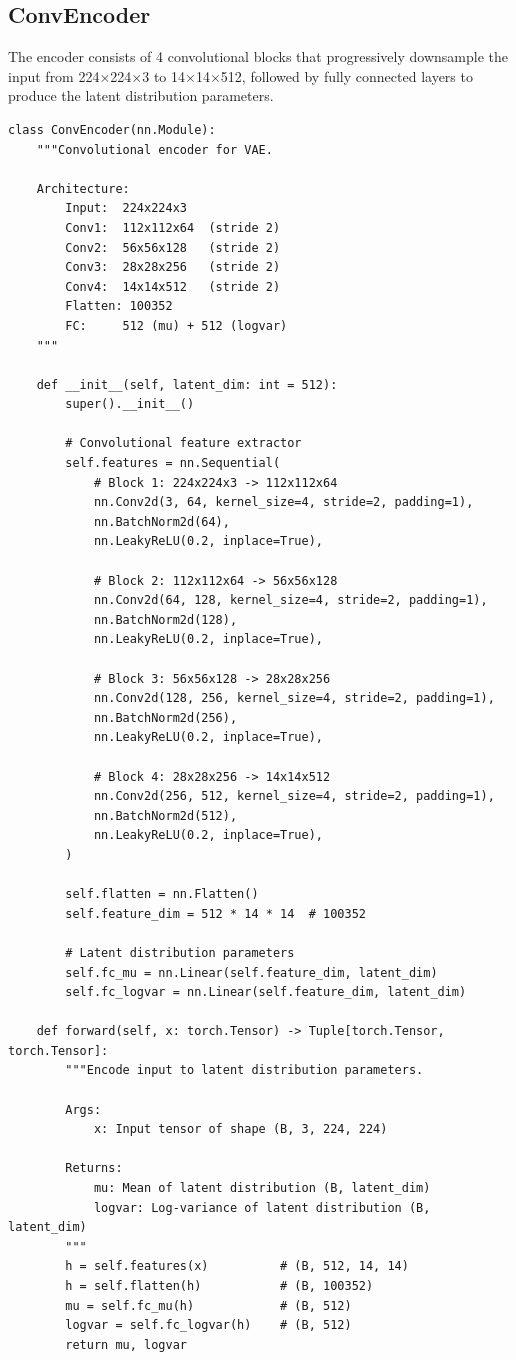 \documentclass[11pt,a4paper]{article}
\begin{document}
\subsection{ConvEncoder}

The encoder consists of 4 convolutional blocks that progressively downsample the input from 224$\times$224$\times$3 to 14$\times$14$\times$512, followed by fully connected layers to produce the latent distribution parameters.

\begin{lstlisting}[caption={src/conv\_vae.py - ConvEncoder}, label={lst:convencoder}]
class ConvEncoder(nn.Module):
    """Convolutional encoder for VAE.

    Architecture:
        Input:  224x224x3
        Conv1:  112x112x64  (stride 2)
        Conv2:  56x56x128   (stride 2)
        Conv3:  28x28x256   (stride 2)
        Conv4:  14x14x512   (stride 2)
        Flatten: 100352
        FC:     512 (mu) + 512 (logvar)
    """

    def __init__(self, latent_dim: int = 512):
        super().__init__()

        # Convolutional feature extractor
        self.features = nn.Sequential(
            # Block 1: 224x224x3 -> 112x112x64
            nn.Conv2d(3, 64, kernel_size=4, stride=2, padding=1),
            nn.BatchNorm2d(64),
            nn.LeakyReLU(0.2, inplace=True),

            # Block 2: 112x112x64 -> 56x56x128
            nn.Conv2d(64, 128, kernel_size=4, stride=2, padding=1),
            nn.BatchNorm2d(128),
            nn.LeakyReLU(0.2, inplace=True),

            # Block 3: 56x56x128 -> 28x28x256
            nn.Conv2d(128, 256, kernel_size=4, stride=2, padding=1),
            nn.BatchNorm2d(256),
            nn.LeakyReLU(0.2, inplace=True),

            # Block 4: 28x28x256 -> 14x14x512
            nn.Conv2d(256, 512, kernel_size=4, stride=2, padding=1),
            nn.BatchNorm2d(512),
            nn.LeakyReLU(0.2, inplace=True),
        )

        self.flatten = nn.Flatten()
        self.feature_dim = 512 * 14 * 14  # 100352

        # Latent distribution parameters
        self.fc_mu = nn.Linear(self.feature_dim, latent_dim)
        self.fc_logvar = nn.Linear(self.feature_dim, latent_dim)

    def forward(self, x: torch.Tensor) -> Tuple[torch.Tensor, torch.Tensor]:
        """Encode input to latent distribution parameters.

        Args:
            x: Input tensor of shape (B, 3, 224, 224)

        Returns:
            mu: Mean of latent distribution (B, latent_dim)
            logvar: Log-variance of latent distribution (B, latent_dim)
        """
        h = self.features(x)          # (B, 512, 14, 14)
        h = self.flatten(h)           # (B, 100352)
        mu = self.fc_mu(h)            # (B, 512)
        logvar = self.fc_logvar(h)    # (B, 512)
        return mu, logvar
\end{lstlisting}
\end{document}
